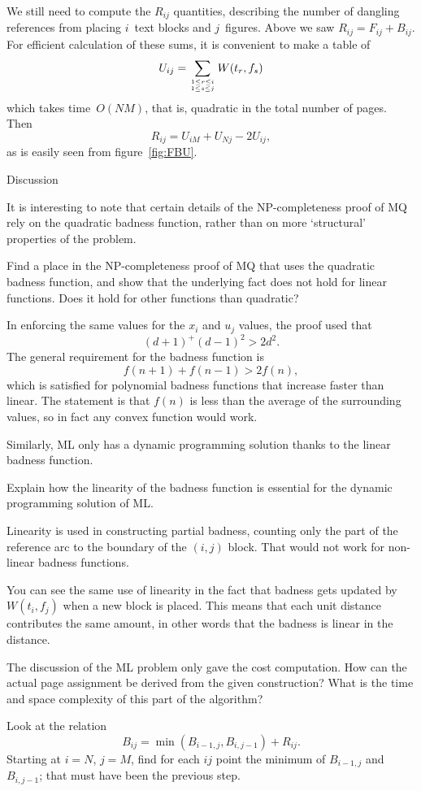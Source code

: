 We still need to compute the $R_{ij}$ quantities, describing the
number of dangling references from placing $i$~text blocks and
$j$~figures.
Above we saw  $R_{ij}=F_{ij}+B_{ij}$.
For efficient calculation of these sums, it is convenient to make a
table of
\[ U_{ij} = \sum_{{1\leq r\leq i\atop 1\leq s\leq j}}W(t_r,f_s) \]
which takes time~$O(NM)$, that is, quadratic in the total number of
pages. Then 
\[ R_{ij} = U_{iM}+U_{Nj}-2U_{ij}, \]
as is easily seen from figure~\ref{fig:FBU}.

 {Discussion}

It is interesting to note that
certain details of the NP-completeness proof of MQ
rely on the quadratic badness
function, rather than on more `structural' properties of the problem.
\begin{594exercise}
Find a place in the NP-completeness proof of MQ that uses the
quadratic badness function, and show that the underlying fact does not
hold for linear functions. Does it hold for other functions than
quadratic?
\end{594exercise}
\begin{answer}
In enforcing the same values for the $x_i$ and $u_j$ values, the proof
used that 
\[ (d+1)^+(d-1)^2>2d^2. \]
The general requirement for the badness function is
\[ f(n+1)+f(n-1)>2f(n), \]
which is satisfied for polynomial badness functions that increase
faster than linear. The statement is that $f(n)$ is less than the
average of the surrounding values, so in fact any convex function
would work.
\end{answer}

Similarly, ML only has a dynamic programming solution thanks to the
linear badness function.
\begin{594exercise}
Explain how the linearity of the badness function is essential for the
dynamic programming solution of ML.
\end{594exercise}
\begin{answer}
Linearity is used in constructing partial badness, counting only the
part of the reference arc to the boundary of the $(i,j)$ block.
That would not work for non-linear badness functions.

You can see the same use of linearity in the fact that badness gets
updated by $W(t_i,f_j)$ when a new block is placed.  This
means that each unit distance contributes the same amount, in other
words that the badness is linear in the distance.
\end{answer}

\begin{594exercise}
The discussion of the ML problem only gave the cost computation. How
can the actual page assignment be derived from the given construction?
What is the time and space complexity of this part of the algorithm?
\end{594exercise}
\begin{answer}
Look at the relation
\[ B_{ij} = \min(B_{i-1,j},B_{i,j-1})+R_{ij}. \]
Starting at $i=N$, $j=M$, find for each $ij$ point the minimum of
$B_{i-1,j}$ and~$B_{i,j-1}$; that must have been the previous step.
\end{answer}
